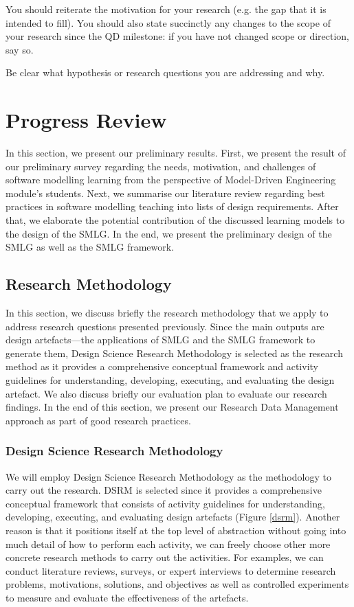 \documentclass[12pt, a4paper]{report}
\begin{document}
You should reiterate the motivation for your research (e.g. the gap that it is intended to fill). You should also state succinctly any changes to the scope of your research since the QD milestone: if you have not changed scope or direction, say so.

Be clear what hypothesis or research questions you are addressing and why.

\chapter{Progress Review}
\label{Progres Review}

In this section, we present our preliminary results. First, we present the
result of our preliminary survey regarding the needs, motivation, and challenges
of software modelling learning from the perspective of Model-Driven Engineering
module's students. Next, we summarise our literature review regarding best
practices in software modelling teaching into lists of design requirements.
After that, we elaborate the potential contribution of the discussed learning
models to the design of the SMLG. In the end, we present the preliminary design
of the SMLG as well as the SMLG framework.

\section{Research Methodology}
In this section, we discuss briefly the research methodology that we apply to
address research questions presented previously. Since the main outputs are
design artefacts---the applications of SMLG and the SMLG framework to generate
them, Design Science Research Methodology \cite{peffers2007design} is selected
as the research method as it provides a comprehensive conceptual framework and
activity guidelines for understanding, developing, executing, and evaluating the
design artefact. We also discuss briefly our evaluation plan to evaluate our
research findings. In the end of this section, we present our Research Data
Management approach as part of good research practices.

\subsection{Design Science Research Methodology}
We will employ Design Science Research Methodology \cite{peffers2007design} as
the methodology to carry out the research. DSRM is selected since it provides a
comprehensive conceptual framework that consists of activity guidelines for
understanding, developing, executing, and evaluating design artefacts (Figure
\ref{dsrm}). Another reason is that it positions itself at the top level of
abstraction without going into much detail of how to perform each activity, we
can freely choose other more concrete research methods to carry out the
activities. For examples, we can conduct literature reviews, surveys, or expert
interviews to determine research problems, motivations, solutions, and
objectives as well as controlled experiments to measure and evaluate the
effectiveness of the artefacts.
\end{document}
